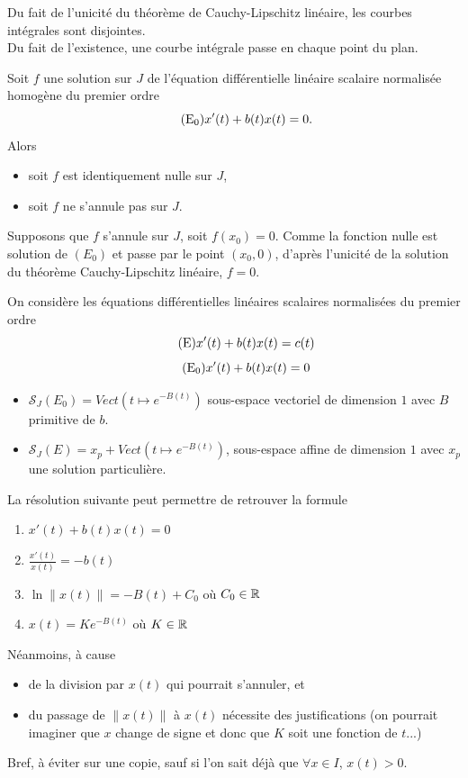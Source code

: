 \documentclass{book}
\begin{document}
\begin{Demonstration}
Du fait de l'unicité du théorème de Cauchy-Lipschitz linéaire, les courbes intégrales sont disjointes.\\
Du fait de l'existence, une courbe intégrale passe en chaque point du plan.
\end{Demonstration}
\begin{Corollaire}
Soit $f$ une solution sur $J$ de l'équation différentielle linéaire scalaire
normalisée homogène du premier ordre
\[\tag{$\mathrm{E_0}$} x'(t) + b(t) x(t) = 0.\]
Alors
\begin{itemize}
\item soit $f$ est identiquement nulle sur $J$,
\item soit $f$ ne s'annule pas sur $J$.
\end{itemize}
\end{Corollaire}
\begin{Demonstration}
Supposons que $f$ s'annule sur $J$, soit $f(x_0)=0$. Comme la fonction nulle est solution de $(E_0)$ et passe par le point $(x_0,0)$, d'après l'unicité de la solution du théorème Cauchy-Lipschitz linéaire, $f=0$. 
\end{Demonstration}


\begin{Theoreme}[Structure]
On considère les équations différentielles linéaires scalaires
normalisées du premier ordre 
\[\tag{$\mathrm{E}$}   x'(t) + b(t)x(t) = c(t)\]
\[\tag{$\mathrm{E_0}$} x'(t) + b(t)x(t) = 0\]
\begin{itemize}
\item $\mathcal{S}_J(E_0)=Vect(t\mapsto e^{-B(t)})$ sous-espace vectoriel de dimension $1$ avec $B$ primitive de $b$.
\item $\mathcal{S}_J(E) = x_p +Vect(t\mapsto e^{-B(t)})$, sous-espace affine de dimension $1$ avec $x_p$ une solution particulière.
\end{itemize}
\end{Theoreme}
La \og{}résolution\fg{} suivante peut permettre de retrouver la formule
\begin{enumerate}
\item $x'(t) + b(t) x(t) = 0$
\item $\frac{x'(t)}{x(t)} = -b(t)$
\item $\ln\|x(t)\| = -B(t) + C_0$ où $C_0\in \mathbb{R}    $
\item $x(t) = K e^{-B(t)}$ où $K\in \mathbb{R}    $
\end{enumerate}
Néanmoins,  à cause
\begin{itemize}
\item de la division par $x(t)$ qui pourrait s'annuler, et
\item du passage de $\|x(t)\|$ à $x(t)$ nécessite des justifications
  (on pourrait imaginer que $x$ change de signe et donc que $K$ soit une fonction de $t$...)
\end{itemize}
Bref, à éviter sur une copie, sauf si l'on sait déjà que $\forall x\in I$, $x(t)>0$.
\end{document}
